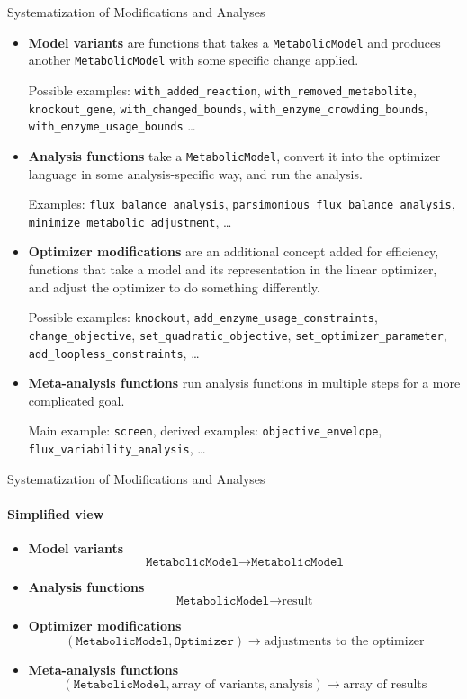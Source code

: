 \documentclass[aspectratio=169]{beamer}
\begin{document}
\begin{frame}[fragile]{Systematization of Modifications and Analyses}
\begin{itemize}\footnotesize
\item \textbf{Model variants} are functions that takes a \verb|MetabolicModel| and produces another \verb|MetabolicModel| with some specific change applied.

Possible examples: \verb|with_added_reaction|, \verb|with_removed_metabolite|, \verb|knockout_gene|, \verb|with_changed_bounds|, \verb|with_enzyme_crowding_bounds|, \verb|with_enzyme_usage_bounds| \dots

\item \textbf{Analysis functions} take a \verb|MetabolicModel|, convert it into the optimizer language in some analysis-specific way, and run the analysis.

Examples: \verb|flux_balance_analysis|, \verb|parsimonious_flux_balance_analysis|, \verb|minimize_metabolic_adjustment|, \dots

\item \textbf{Optimizer modifications} are an additional concept added for efficiency, functions that take a model and its representation in the linear optimizer, and adjust the optimizer to do something differently.

Possible examples: \verb|knockout|, \verb|add_enzyme_usage_constraints|, \verb|change_objective|, \verb|set_quadratic_objective|, \verb|set_optimizer_parameter|, \verb|add_loopless_constraints|, \dots

\item \textbf{Meta-analysis functions} run analysis functions in multiple steps for a more complicated goal.

Main example: \verb|screen|, derived examples: \verb|objective_envelope|, \verb|flux_variability_analysis|, \dots
\end{itemize}
\end{frame}

\begin{frame}[fragile]{Systematization of Modifications and Analyses}
\framesubtitle{Simplified view}
\begin{itemize}
\item \textbf{Model variants} 
\[\texttt{MetabolicModel} \to \texttt{MetabolicModel}\]
\item \textbf{Analysis functions} 
\[\texttt{MetabolicModel} \to \text{result}\]
\item \textbf{Optimizer modifications} 
\[(\texttt{MetabolicModel}, \texttt{Optimizer}) \to \text{adjustments to the optimizer}\]
\item \textbf{Meta-analysis functions} 
\[(\texttt{MetabolicModel}, \text{array of variants}, \text{analysis}) \to \text{array of results}\]
\end{itemize}
\end{frame}
\end{document}
